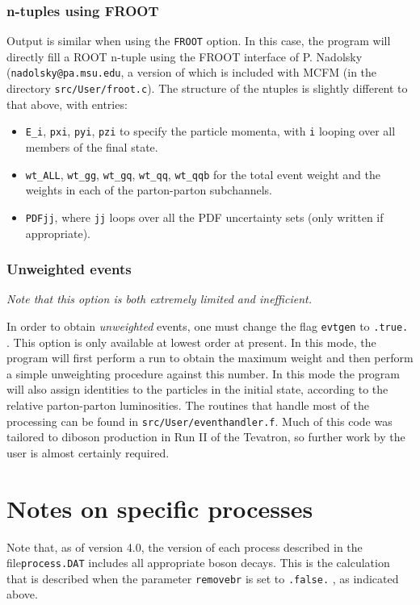 \documentclass[12pt]{article}
\begin{document}
\subsubsection{n-tuples using FROOT}
Output is similar when using the {\tt FROOT} option. In this case, the program will directly
fill a ROOT n-tuple using the FROOT interface of P. Nadolsky ({\tt nadolsky@pa.msu.edu}, a version
of which is included with MCFM (in the directory {\tt src/User/froot.c}). The structure
of the ntuples is slightly different to that above, with entries:
\begin{itemize}
\item {\tt E\_i}, {\tt pxi}, {\tt pyi}, {\tt pzi} to specify the particle momenta, with {\tt i}
 looping over all members of the final state.
\item {\tt wt\_ALL}, {\tt wt\_gg}, {\tt wt\_gq}, {\tt wt\_qq}, {\tt wt\_qqb} for the total event
 weight and the weights in each of the parton-parton subchannels.
\item {\tt PDFjj}, where {\tt jj} loops over all the PDF uncertainty sets (only written if
 appropriate).
\end{itemize}

\subsubsection{Unweighted events}
{\it Note that this option is both extremely limited and inefficient.}

In order to obtain {\it unweighted} events, one must change the flag
{\tt evtgen} to {\tt .true.} . This option is only available at lowest order
at present. In this mode, the program will first perform a run to obtain the
maximum weight and then perform a simple unweighting procedure against this
number. In this mode the program will also assign identities to the
particles in the initial state, according to the relative parton-parton
luminosities. The routines that handle most of the processing can be found
in {\tt src/User/eventhandler.f}. Much of this code was tailored to diboson
production in Run II of the Tevatron, so further work by the user is almost
certainly required.

\section{Notes on specific processes}
\label{sec:specific}

Note that, as of version 4.0, the version of each process described in the file{\tt process.DAT} includes all appropriate boson decays. This is the 
calculation
that is described when the parameter {\tt removebr} is set to {\tt .false.} ,
as indicated above.
\end{document}
